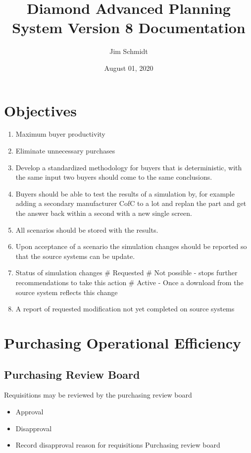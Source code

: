 \documentclass[letterpaper,10pt,english]{sphinxmanual}
\title{Diamond Advanced Planning System Version 8 Documentation}
\date{August 01, 2020}
\author{Jim Schmidt}
\begin{document}
\maketitle
\tableofcontents
{}\label{index::doc}



\chapter{Objectives}
\label{FutureState:objectives}\label{FutureState::doc}\label{FutureState:future-state}\begin{enumerate}
\item {} 
Maximum buyer productivity

\item {} 
Eliminate unnecessary purchases

\item {} 
Develop a standardized methodology for buyers that is deterministic,
with the same input two buyers should come to the same conclusions.

\item {} 
Buyers should be able to test the results of a simulation by, for
example adding a secondary manufacturer CofC to a lot and replan the
part and get the answer back within a second with a new single
screen.

\item {} 
All scenarios should be stored with the results.

\item {} 
Upon acceptance of a scenario the simulation changes should be
reported so that the source systems can be update.

\item {} 
Status of simulation changes \# Requested \# Not possible - stops
further recommendations to take this action \# Active - Once a
download from the source system reflects this change

\item {} 
A report of requested modification not yet completed on source
systems

\end{enumerate}


\chapter{Purchasing Operational Efficiency}
\label{FutureState:purchasing-operational-efficiency}

\section{Purchasing Review Board}
\label{FutureState:purchasing-review-board}
Requisitions may be reviewed by the purchasing review board
\begin{itemize}
\item {} 
Approval

\item {} 
Disapproval

\item {} 
Record disapproval reason for requisitions Purchasing review board

\end{itemize}
\end{document}
